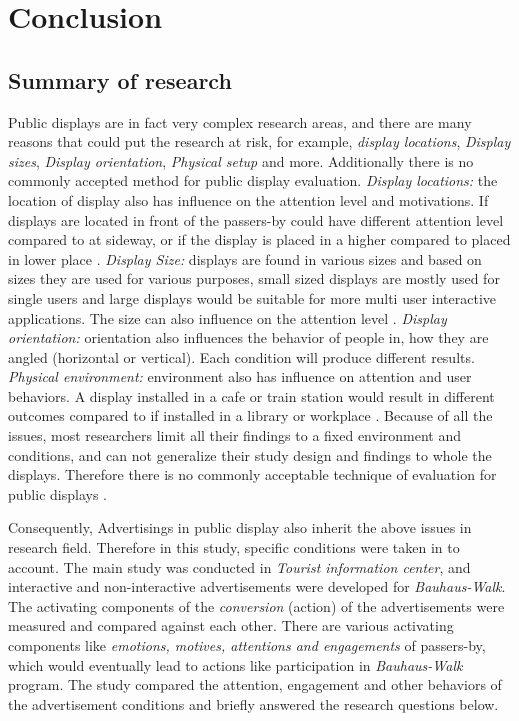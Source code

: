 \chapter{Conclusion} %

\label{Chapter10} %
\newpage

\section{Summary of research}

Public displays are in fact very complex research areas, and there are many reasons that could put the research at risk, for example, \emph{display locations}, \emph{Display sizes}, \emph{ Display orientation}, \emph{Physical setup} and more. Additionally there is no commonly accepted method for public display evaluation. \emph{Display locations:} the location of display also has influence on the attention level and motivations. If displays are located in front of the passers-by could have different attention level compared to at sideway, or if the display is placed in a higher compared to placed in lower place \cite{WhenPublicDisplays}. \emph{Display Size:} displays are found in various sizes and based on sizes they are used for various purposes, small sized displays are mostly used for single users and large displays would be suitable for more multi user interactive applications. The size can also influence on the attention level \cite{WhenPublicDisplays}. \emph{Display orientation:} orientation also influences the behavior of people in, how they are angled (horizontal or vertical). Each condition will produce different results\cite{DisplayAngleEffect}. \emph{Physical environment:} environment also has influence on attention and user behaviors. A display installed in a cafe or train station\cite{multimediaworkplace} would result in different outcomes compared to if installed in a library or workplace \cite{multimediaworkplace, semidisplay }. Because of all the issues, most researchers limit all their findings to a fixed environment and conditions, and can not generalize their study design and findings to whole the displays.  Therefore there is no commonly acceptable technique of evaluation for public displays \cite{HowToEvaluate}.

Consequently, Advertisings in public display also inherit the above issues in research field. Therefore in this study, specific conditions were taken in to account. The main study was conducted in \emph{Tourist information center}, and interactive and non-interactive advertisements were developed for \emph{Bauhaus-Walk}. The activating components of the \emph{conversion} (action) of the advertisements were measured and compared against each other. There are various activating components like \emph{emotions, motives, attentions and engagements} of passers-by, which would eventually lead to actions like participation in \emph{Bauhaus-Walk} program. The study compared the attention, engagement and other behaviors of the advertisement conditions and briefly answered the research questions below.





